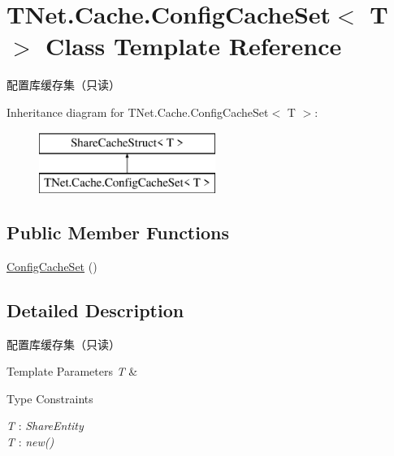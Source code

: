 \hypertarget{class_t_net_1_1_cache_1_1_config_cache_set}{}\section{T\+Net.\+Cache.\+Config\+Cache\+Set$<$ T $>$ Class Template Reference}
\label{class_t_net_1_1_cache_1_1_config_cache_set}


配置库缓存集（只读）  


Inheritance diagram for T\+Net.\+Cache.\+Config\+Cache\+Set$<$ T $>$\+:\begin{figure}[H]
\begin{center}
\leavevmode
\includegraphics[height=2.000000cm]{class_t_net_1_1_cache_1_1_config_cache_set}
\end{center}
\end{figure}
\subsection*{Public Member Functions}
\begin{DoxyCompactItemize}
\item 
\mbox{\hyperlink{class_t_net_1_1_cache_1_1_config_cache_set_a2514d02ae609415d1204a8acbe8073d3}{Config\+Cache\+Set}} ()
\end{DoxyCompactItemize}


\subsection{Detailed Description}
配置库缓存集（只读） 


\begin{DoxyTemplParams}{Template Parameters}
{\em T} & \\
\hline
\end{DoxyTemplParams}
\begin{Desc}
\item[Type Constraints]\begin{description}
\item[{\em T} : {\em Share\+Entity}]\item[{\em T} : {\em new()}]\end{description}
\end{Desc}


